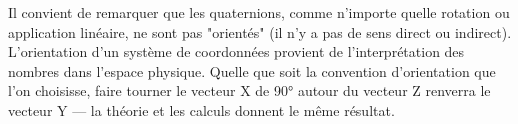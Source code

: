 Il convient de remarquer que les quaternions, comme n'importe quelle rotation ou application linéaire, ne sont pas "orientés" (il n'y a pas de sens direct ou indirect).
L'orientation d'un système de coordonnées provient de l'interprétation des nombres 
dans l'espace physique. Quelle que soit la convention d'orientation que l'on choisisse,
faire tourner le vecteur X de \ang{90} autour du vecteur Z renverra le vecteur Y — 
la théorie et les calculs donnent le même résultat.